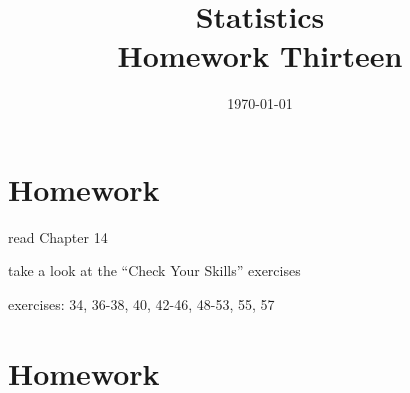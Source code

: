 \documentclass[letterpaper, landscape]{exam}
\title{Statistics \\ Homework Thirteen}
\date{\today}
\author{}
\begin{document}
  \maketitle

  \section{Homework}
  \ifprintanswers
  \else
    \begin{itemize*}
      \item read Chapter 14 
      \item take a look at the ``Check Your Skills'' exercises
      \item exercises: 34, 36-38, 40, 42-46, 48-53, 55, 57
    \end{itemize*}
  \fi

  \section{Homework}
\end{document}
